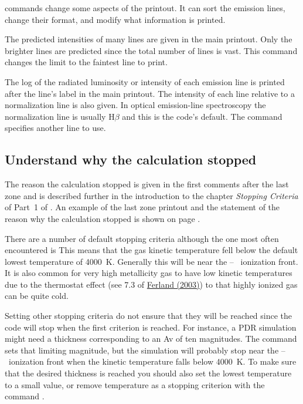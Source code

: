 \documentclass[12pt,twoside]{article}
\begin{document}
 commands change some aspects
of the printout.  It can sort the
emission lines, change their format, and modify what information is printed.

  The
predicted intensities of many lines are given
in the main printout.  Only the brighter lines are predicted since the total
number of lines is vast.  This command changes the limit to the faintest
line to print.

 The log of the radiated
luminosity or intensity of each emission
line is printed after the line's label in the main printout.
The intensity
of each line relative to a normalization line is also given.
In optical
emission-line spectroscopy the normalization line is usually
$\mathrm{H}\beta$ and this is the code's default.
The  command specifies
another line to use.

\subsection{Understand why the calculation stopped}

The reason the calculation stopped is given in the first
comments after the last zone and is described further in the introduction
to the chapter \emph{Stopping Criteria} of Part~1 of \Hazy.
An example of the last
zone printout and the statement of the reason why the calculation stopped
is shown on page \pageref{sec:ZoneOutput}.

There are a number of default stopping criteria although the one most
often encountered is 
This means that the gas kinetic temperature fell below the default
lowest temperature of 4000~K.
Generally this will be near the \hplus -- \hO\ ionization front.
It is also common for very high metallicity gas to have low kinetic temperatures
due to the thermostat effect (see 7.3 of
\href{http://adsabs.harvard.edu/abs/2003ARA%26A..41..517F}{Ferland (2003)})
to that highly ionized gas can be quite cold.

Setting other stopping criteria do not ensure that they will be reached since
the code will stop when the first criterion is reached.  For instance, a PDR simulation
might need a thickness corresponding to an Av  of ten magnitudes.  
The command  sets that limiting magnitude,
but the simulation will probably stop near the \hplus -- \hO\ ionization front
when the kinetic temperature falls below 4000~K.  To make sure that the desired
thickness is reached you should also set the lowest temperature to a small value, or
remove temperature as a stopping criterion with the command
.
\end{document}
